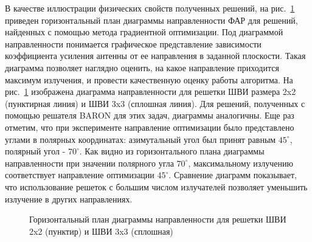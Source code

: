 В качестве иллюстрации физических свойств полученных решений, на рис.~\ref{ris:bve_comp} приведен горизонтальный план диаграммы направленности ФАР для решений, найденных с помощью метода градиентной оптимизации. Под диаграммой направленности понимается графическое представление зависимости коэффициента усиления антенны от ее направления в заданной плоскости. Такая диаграмма позволяет наглядно оценить, на какое направление приходится максимум излучения, и провести качественную оценку работы алгоритма. На рис.~\ref{ris:bve_comp} изображена диаграмма направленности для решетки ШВИ размера 2x2 (пунктирная линия) и ШВИ 3x3 (сплошная линия). Для решений, полученных с помощью решателя BARON для этих задач, диаграммы аналогичны. Еще раз отметим, что при эксперименте направление оптимизации было представлено углами в полярных координатах: азимутальный угол был принят равным $45^{\circ}$, полярный угол - $70^{\circ}$. Как видно из горизонтального плана диаграммы направленности при значении полярного угла $70^{\circ}$, максимальному излучению соответствует направление оптимизации $45^{\circ}$. Сравнение диаграмм показывает, что использование решеток с большим числом излучателей позволяет уменьшить излучение в других направлениях.

\begin{figure}[h]
    \centering
    \vspace{0.7em}
    \caption{Горизонтальный план диаграммы направленности для решетки ШВИ 2x2 (пунктир) и ШВИ 3x3 (сплошная)}
    \label{ris:bve_comp}
\end{figure}